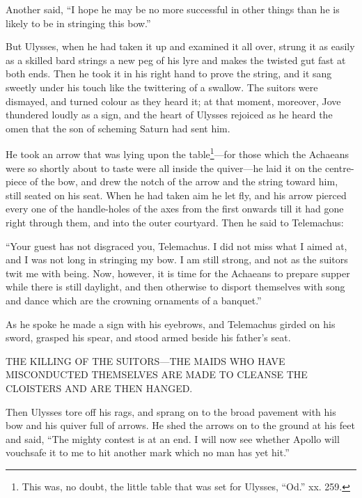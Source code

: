 Another said, “I hope he may be no more successful in other things than he is
likely to be in stringing this bow.”

But Ulysses, when he had taken it up and examined it all over, strung it as
easily as a skilled bard strings a new peg of his lyre and makes the twisted
gut fast at both ends. Then he took it in his right hand to prove the string,
and it sang sweetly under his touch like the twittering of a swallow. The
suitors were dismayed, and turned colour as they heard it; at that moment,
moreover, Jove thundered loudly as a sign, and the heart of Ulysses rejoiced as
he heard the omen that the son of scheming Saturn had sent him.

He took an arrow that was lying upon the table\footnote{This was, no doubt, the little table that was set for Ulysses, “Od.” xx.
259.}—for those which the Achaeans were
so shortly about to taste were all inside the quiver—he laid it on the
centre-piece of the bow, and drew the notch of the arrow and the string toward
him, still seated on his seat. When he had taken aim he let fly, and his arrow
pierced every one of the handle-holes of the axes from the first onwards till
it had gone right through them, and into the outer courtyard. Then he said to
Telemachus:

“Your guest has not disgraced you, Telemachus. I did not miss what I aimed at,
and I was not long in stringing my bow. I am still strong, and not as the
suitors twit me with being. Now, however, it is time for the Achaeans to
prepare supper while there is still daylight, and then otherwise to disport
themselves with song and dance which are the crowning ornaments of a banquet.”

As he spoke he made a sign with his eyebrows, and Telemachus girded on his
sword, grasped his spear, and stood armed beside his father’s seat.


THE KILLING OF THE SUITORS—THE MAIDS WHO HAVE MISCONDUCTED THEMSELVES ARE MADE
TO CLEANSE THE CLOISTERS AND ARE THEN HANGED.

Then Ulysses tore off his rags, and sprang on to the broad pavement with his
bow and his quiver full of arrows. He shed the arrows on to the ground at his
feet and said, “The mighty contest is at an end. I will now see whether Apollo
will vouchsafe it to me to hit another mark which no man has yet hit.”

